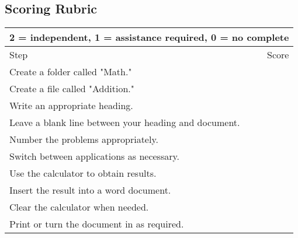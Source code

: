 \documentclass[10pt,letterpaper,twoside]{report}
\begin{document}
{{\subsection{Scoring Rubric}
{
\renewcommand{\arraystretch}{1.5}
\begin{table}[!htbp]
	\centering
	\begin{tabular}{|l|r|}
		\hline
		\multicolumn{2}{|c|}{2 = independent, 1 = assistance required, 0 = no complete} \\
		\hline
		Step                                                  & Score \\[.5em]
		\hline
		Create a folder called "Math."                        &       \\ \hline	
		Create a file called "Addition."                      &       \\ \hline		
		Write an appropriate heading.                         &       \\ \hline
		Leave a blank line between your heading and document. &       \\ \hline		
		Number the problems appropriately.                    &       \\ \hline
		Switch between applications as necessary.             &       \\ \hline
		Use the calculator to obtain results.                 &       \\ \hline
		Insert the result into a word document.               &       \\ \hline
		Clear the calculator when needed.                     &       \\ \hline
		Print or turn the document in as required.            &       \\ \hline
	\end{tabular}
	
\end{table}
}}}
\end{document}
